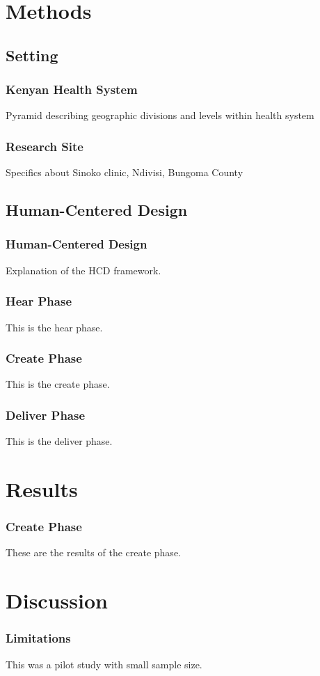 \documentclass{beamer}
\begin{document}
\section{Methods}
\subsection{Setting}
\begin{frame}
\frametitle{Kenyan Health System}
Pyramid describing geographic divisions and levels within health system
\end{frame}

\begin{frame}
\frametitle{Research Site}
Specifics about Sinoko clinic, Ndivisi, Bungoma County
\end{frame}

\subsection{Human-Centered Design}
\begin{frame}
\frametitle{Human-Centered Design}
Explanation of the HCD framework.
\end{frame}

\begin{frame}
\frametitle{Hear Phase}
This is the hear phase.
\end{frame}

\begin{frame}
\frametitle{Create Phase}
This is the create phase.
\end{frame}

\begin{frame}
\frametitle{Deliver Phase}
This is the deliver phase.
\end{frame}

\section{Results}
\begin{frame}
\frametitle{Create Phase}
These are the results of the create phase.
\end{frame}


\section{Discussion}
\begin{frame}
\frametitle{Limitations}
This was a pilot study with small sample size.
\end{frame}
\end{document}
